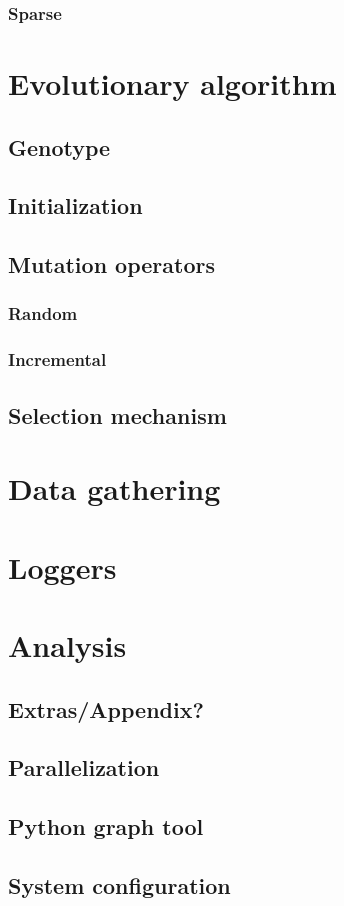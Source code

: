 		\subsubsection{Sparse}

\section{Evolutionary algorithm}
	\subsection{Genotype}
	\subsection{Initialization}
	\subsection{Mutation operators}
		\subsubsection{Random}
		\subsubsection{Incremental}
	\subsection{Selection mechanism}

\section{Data gathering}
	\section{Loggers}
	\section{Analysis}
	
\subsection{Extras/Appendix?}
	\subsection{Parallelization}
	\subsection{Python graph tool}
	\subsection{System configuration}
	
	